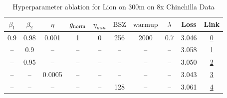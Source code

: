 \begin{table}[H]
\centering
\caption{Hyperparameter ablation for Lion on 300m on 8x Chinchilla Data}
\label{tab:ablation_lion_300m_on_8x_chinchilla_data}
\begin{tabular}{cccccccccc}
\toprule
$\beta_1$ & $\beta_2$ & $\eta$ & $g_{\mathrm{norm}}$ & $\eta_{min}$ & $\mathrm{BSZ}$ & $\mathrm{warmup}$ & $\lambda$ & Loss & Link \\
\midrule
0.9 & 0.98 & 0.001 & 1 & 0 & 256 & 2000 & 0.7 & 3.046 & \href{https://wandb.ai/marin-community/optimizer-scaling/runs/sweep-300m-48B-lioneb1a25lr0.001-wd0.7-minlr0-warmup2000-b10.9-b-2006af}{0} \\
\midrule
-- & 0.9 & -- & -- & -- & -- & -- & -- & 3.058 & \href{https://wandb.ai/marin-community/optimizer-scaling/runs/sweep-300m-48B-lion2962dblr0.001-wd0.7-minlr0-warmup2000-b10.9-b-5ec1df}{1} \\
-- & 0.95 & -- & -- & -- & -- & -- & -- & 3.050 & \href{https://wandb.ai/marin-community/optimizer-scaling/runs/sweep-300m-48B-lion2842d8lr0.001-wd0.7-minlr0-warmup2000-b10.9-b-df0b7e}{2} \\
-- & -- & 0.0005 & -- & -- & -- & -- & -- & 3.043 & \href{https://wandb.ai/marin-community/optimizer-scaling/runs/sweep-300m-48B-lion698f3blr0.0005-wd0.7-minlr0-warmup2000-b10.9--6f8954}{3} \\
-- & -- & -- & -- & -- & 128 & -- & -- & 3.061 & \href{https://wandb.ai/marin-community/optimizer-scaling/runs/sweep-300m-48B-lion875c0alr0.001-wd0.7-minlr0-warmup2000-b10.9-b-a1a7a1}{4} \\
\bottomrule
\end{tabular}
\end{table}

